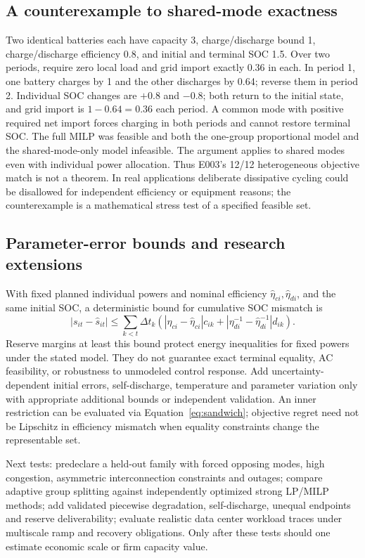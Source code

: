 \documentclass[11pt,letterpaper]{article}
\begin{document}
\subsection{A counterexample to shared-mode exactness}
Two identical batteries each have capacity 3, charge/discharge bound 1, charge/discharge efficiency 0.8, and initial and terminal SOC 1.5. Over two periods, require zero local load and grid import exactly 0.36 in each. In period 1, one battery charges by 1 and the other discharges by 0.64; reverse them in period 2. Individual SOC changes are $+0.8$ and $-0.8$; both return to the initial state, and grid import is $1-0.64=0.36$ each period. A common mode with positive required net import forces charging in both periods and cannot restore terminal SOC. The full MILP was feasible and both the one-group proportional model and the shared-mode-only model infeasible. The argument applies to shared modes even with individual power allocation. Thus E003's 12/12 heterogeneous objective match is not a theorem. In real applications deliberate dissipative cycling could be disallowed for independent efficiency or equipment reasons; the counterexample is a mathematical stress test of a specified feasible set.

\subsection{Parameter-error bounds and research extensions}
With fixed planned individual powers and nominal efficiency $\widehat\eta_{ci},\widehat\eta_{di}$, and the same initial SOC, a deterministic bound for cumulative SOC mismatch is
\[
|s_{it}-\widehat s_{it}|
\le\sum_{k<t}\Delta t_k\left(
|\eta_{ci}-\widehat\eta_{ci}|c_{ik}+
|\eta_{di}^{-1}-\widehat\eta_{di}^{-1}|d_{ik}\right).
\]
Reserve margins at least this bound protect energy inequalities for fixed powers under the stated model. They do not guarantee exact terminal equality, AC feasibility, or robustness to unmodeled control response. Add uncertainty-dependent initial errors, self-discharge, temperature and parameter variation only with appropriate additional bounds or independent validation. An inner restriction can be evaluated via Equation~\ref{eq:sandwich}; objective regret need not be Lipschitz in efficiency mismatch when equality constraints change the representable set.

Next tests: predeclare a held-out family with forced opposing modes, high congestion, asymmetric interconnection constraints and outages; compare adaptive group splitting against independently optimized strong LP/MILP methods; add validated piecewise degradation, self-discharge, unequal endpoints and reserve deliverability; evaluate realistic data center workload traces under multiscale ramp and recovery obligations. Only after these tests should one estimate economic scale or firm capacity value.
\end{document}

